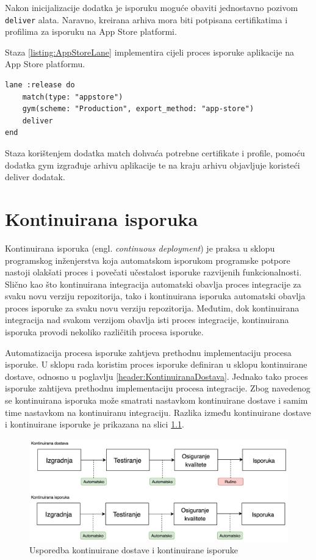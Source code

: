 \documentclass[times, utf8, diplomski, numeric]{fer}
\newcommand{\eng}[1]{(engl. \textit{#1})}
\begin{document}
Nakon inicijalizacije dodatka je isporuku moguće obaviti jednostavno pozivom \verb|deliver| alata. Naravno, kreirana arhiva mora biti potpisana certifikatima i profilima za isporuku na App Store platformi.

Staza \ref{listing:AppStoreLane} implementira cijeli proces isporuke aplikacije na App Store platformu.

\begin{lstlisting}[caption=Isporuka na App Store platformu korištenjem dodatka deliver, label=listing:AppStoreLane]
lane :release do
    match(type: "appstore")
    gym(scheme: "Production", export_method: "app-store")
    deliver
end
\end{lstlisting}

Staza korištenjem dodatka match dohvaća potrebne certifikate i profile, pomoću dodatka gym izgrađuje arhivu aplikacije te na kraju arhivu objavljuje koristeći deliver dodatak.



\chapter{Kontinuirana isporuka} \label{header:KontinuiranaIsporuka}

Kontinuirana isporuka \eng{continuous deployment} je praksa u sklopu programskog inženjerstva koja automatskom isporukom programske potpore nastoji olakšati proces i povečati učestalost isporuke razvijenih funkcionalnosti. Slično kao što kontinuirana integracija automatski obavlja proces integracije za svaku novu verziju repozitorija, tako i kontinuirana isporuka automatski obavlja proces isporuke za svaku novu verziju repozitorija. Međutim, dok kontinuirana integracija nad svakom verzijom obavlja isti proces integracije, kontinuirana isporuka provodi nekoliko različitih procesa isporuke.

Automatizacija procesa isporuke zahtjeva prethodnu implementaciju procesa isporuke. U sklopu rada koristim proces isporuke definiran u sklopu kontinuirane dostave, odnosno u poglavlju \ref{header:KontinuiranaDostava}. Jednako tako proces isporuke zahtijeva prethodnu implementaciju procesa integracije. Zbog navedenog se kontinuirana isporuka može smatrati nastavkom kontinuirane dostave i samim time nastavkom na kontinuiranu integraciju. Razlika između kontinuirane dostave i kontinuirane isporuke je prikazana na slici \ref{fig:CDDifferences}\citep{cd:whats_the_diff}.

\begin{figure}
\centering
\includegraphics[scale=0.55]{CDDifferences}
\caption{Usporedba kontinuirane dostave i kontinuirane isporuke}
\label{fig:CDDifferences}
\end{figure}
\end{document}
